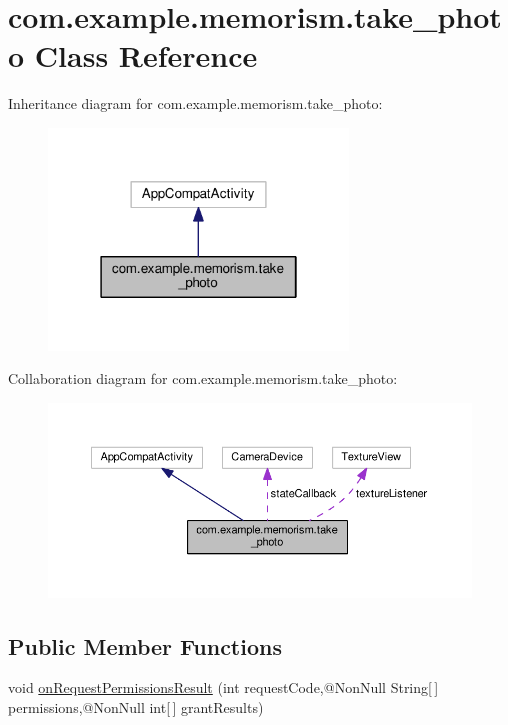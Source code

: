 \hypertarget{classcom_1_1example_1_1memorism_1_1take__photo}{}\section{com.\+example.\+memorism.\+take\+\_\+photo Class Reference}
\label{classcom_1_1example_1_1memorism_1_1take__photo}


Inheritance diagram for com.\+example.\+memorism.\+take\+\_\+photo\+:\nopagebreak
\begin{figure}[H]
\begin{center}
\leavevmode
\includegraphics[width=226pt]{d9/d92/classcom_1_1example_1_1memorism_1_1take__photo__inherit__graph}
\end{center}
\end{figure}


Collaboration diagram for com.\+example.\+memorism.\+take\+\_\+photo\+:\nopagebreak
\begin{figure}[H]
\begin{center}
\leavevmode
\includegraphics[width=350pt]{dd/d80/classcom_1_1example_1_1memorism_1_1take__photo__coll__graph}
\end{center}
\end{figure}
\subsection*{Public Member Functions}
\begin{DoxyCompactItemize}
\item 
void \hyperlink{classcom_1_1example_1_1memorism_1_1take__photo_a01baf490997362acf99a51951aa61d72}{on\+Request\+Permissions\+Result} (int request\+Code,@Non\+Null String\mbox{[}$\,$\mbox{]} permissions,@Non\+Null int\mbox{[}$\,$\mbox{]} grant\+Results)
\end{DoxyCompactItemize}
